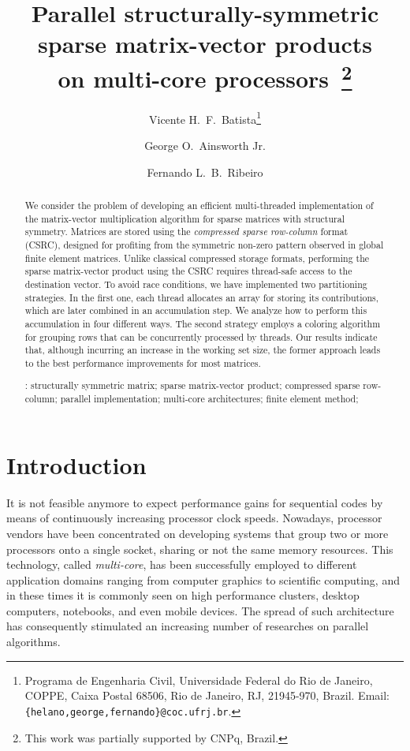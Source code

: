 \documentclass[11pt]{article}
\title{Parallel structurally-symmetric sparse matrix-vector products\\
on multi-core processors~\thanks{This work was partially supported by CNPq, Brazil.}}
\author{Vicente H.~F.~Batista\thanks{Programa de Engenharia Civil, Universidade Federal do Rio de
Janeiro, COPPE, Caixa Postal 68506, Rio de Janeiro, RJ, 21945-970, Brazil.
Email: {\tt \{helano,george,fernando\}@coc.ufrj.br}.} \and
George O.~Ainsworth Jr.\footnotemark[2] \and
Fernando L.~B.~Ribeiro\footnotemark[2]}
\begin{document}
\lstset{language=Fortran,basicstyle=\footnotesize\tt,numbers=left,numberstyle=\tt\scriptsize,keywordstyle=\tt\bf}

\maketitle

\begin{abstract}

We consider the problem of developing an efficient multi-threaded
implementation of the matrix-vector multiplication algorithm for sparse
matrices with structural symmetry.  Matrices are stored using the
\textit{compressed sparse row-column} format (CSRC), designed for profiting
from the symmetric non-zero pattern observed in global finite element matrices.
Unlike classical compressed storage formats, performing the sparse
matrix-vector product using the CSRC requires thread-safe access to the
destination vector.  To avoid race conditions, we have implemented two
partitioning strategies.  In the first one, each thread allocates an array for
storing its contributions, which are later combined in an accumulation step.
We analyze how to perform this accumulation in four different ways.
The second strategy employs a coloring
algorithm for grouping rows that can be concurrently processed by threads. Our
results indicate that, although incurring an increase in the working set size,
the former approach leads to the best performance improvements for
most matrices.

\bigskip

: structurally symmetric matrix; sparse matrix-vector product; compressed sparse
row-column; parallel implementation; multi-core architectures; finite element method;

\end{abstract}

\section{Introduction}

It is not feasible anymore to expect performance gains for sequential codes by means of continuously
increasing processor clock speeds. Nowadays, processor vendors have been
concentrated on developing systems that group two or more processors onto a
single socket, sharing or not the same memory resources.  This technology, called
\textit{multi-core}, has been successfully employed to different application
domains ranging from computer graphics to scientific computing, and in these
times it is commonly seen on high performance clusters, desktop
computers, notebooks, and even mobile devices.  The spread of such architecture
has consequently stimulated an increasing number of researches on parallel
algorithms.
\end{document}
